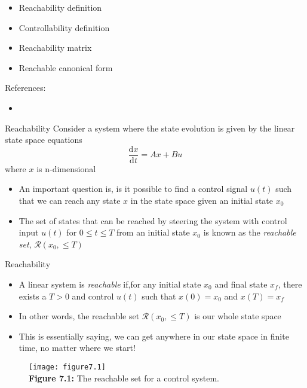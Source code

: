 \documentclass{beamer-control}
\begin{document}

\begin{SUMMARY}
\begin{itemize}
\item Reachability definition
\item Controllability definition
\item Reachability matrix
\item Reachable canonical form
\end{itemize}
\vfill References:
\begin{itemize}
\item {}
\end{itemize}
\end{SUMMARY}




\begin{frame}{Reachability}
Consider a system where the state evolution is given by the linear state space equations
\[\frac{\mathrm{d} x}{\mathrm{d} t} = Ax+Bu\]
where $x$ is n-dimensional
\begin{itemize}
\item An important question is, is it possible to find a control signal $u(t)$ such that we can reach any state $x$ in the state space given an initial state $x_0$
\item The set of states that can be reached by steering the system with control input $u(t)$ for $0\leq t\leq T$ from an initial state $x_0$ is known as the \textit{reachable set}, $\mathcal{R}(x_0,\leq T)$
\end{itemize}
\end{frame}


\begin{frame}{Reachability}
\begin{itemize}
	\item A linear system is \textit{reachable} if,for any initial state $x_0$ and final state $x_f$, there exists a $T>0$ and control $u(t)$ such that $x(0)=x_0$ and $x(T)=x_f$
	\item In other words, the reachable set $\mathcal{R}(x_0,\leq T)$ is our whole state space
	\item This is essentially saying, we can get anywhere in our state space in finite time, no matter where we start!
\end{itemize}

\begin{figure}
	\centering
\texttt{[image: figure7.1]}
\\
\textbf{Figure 7.1:} The reachable set for a control system.
\end{figure}

\end{frame}	
\end{document}
